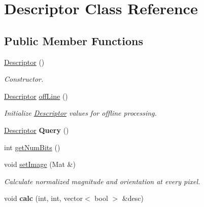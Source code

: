 \hypertarget{classDescriptor}{\section{\-Descriptor \-Class \-Reference}
\label{classDescriptor}
}
\subsection*{\-Public \-Member \-Functions}
\begin{DoxyCompactItemize}
\item 
\hypertarget{classDescriptor_a67969fc893331c2e6d554ddf6d6c55f0}{\hyperlink{classDescriptor_a67969fc893331c2e6d554ddf6d6c55f0}{\-Descriptor} ()}\label{classDescriptor_a67969fc893331c2e6d554ddf6d6c55f0}

\begin{DoxyCompactList}\small\item\em \-Constructor. \end{DoxyCompactList}\item 
\hyperlink{classDescriptor}{\-Descriptor} \hyperlink{classDescriptor_aaa645a033c3f4062daaa1c437401d3f1}{off\-Line} ()
\begin{DoxyCompactList}\small\item\em \-Initialize \hyperlink{classDescriptor}{\-Descriptor} values for offline processing. \end{DoxyCompactList}\item 
\hypertarget{classDescriptor_abe98f6d262c7d8761ead439384b15004}{\hyperlink{classDescriptor}{\-Descriptor} {\bfseries \-Query} ()}\label{classDescriptor_abe98f6d262c7d8761ead439384b15004}

\item 
int \hyperlink{classDescriptor_a6cac06d9e113d7ccd42e9afc59a486e1}{get\-Num\-Bits} ()
\item 
void \hyperlink{classDescriptor_a86f2435a651d8543bf2b7c89a0071fe2}{set\-Image} (\-Mat \&)
\begin{DoxyCompactList}\small\item\em \-Calculate normalized magnitude and orientation at every pixel. \end{DoxyCompactList}\item 
\hypertarget{classDescriptor_a0f36772f8cfcc89141ae1fa857e7b802}{void {\bfseries calc} (int, int, vector$<$ bool $>$ \&desc)}\label{classDescriptor_a0f36772f8cfcc89141ae1fa857e7b802}

\end{DoxyCompactItemize}
